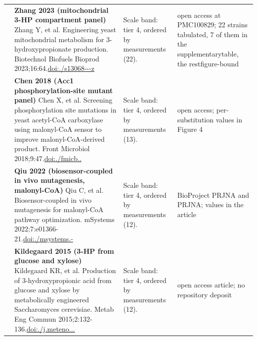 \begin{landscape}
\begin{longtable}{@{}r@{\hspace{4pt}} L{78mm} L{72mm} L{76mm}@{}}
 & \textbf{Zhang 2023 (mitochondrial 3-HP compartment panel)} \newline Zhang Y, et al. Engineering yeast mitochondrial metabolism for 3-hydroxypropionate production. Biotechnol Biofuels Bioprod 2023;16:64.\newline \href{https://doi.org/10.1186/s13068-023-02309-z}{doi:./\allowbreak s13068---\allowbreak z} & Scale band: tier 4, ordered by measurements (22). & open acc\allowbreak ess at P\allowbreak MC100829; 22 s\allowbreak trains t\allowbreak abulated\allowbreak , 7 of t\allowbreak hem in t\allowbreak he suppl\allowbreak ementary\allowbreak  table, \allowbreak the rest\allowbreak  figure-\allowbreak bound \\
 & \textbf{Chen 2018 (Acc1 phosphorylation-site mutant panel)} \newline Chen X, et al. Screening phosphorylation site mutations in yeast acetyl-CoA carboxylase using malonyl-CoA sensor to improve malonyl-CoA-derived product. Front Microbiol 2018;9:47.\newline \href{https://doi.org/10.3389/fmicb.2018.00047}{doi:./\allowbreak fmicb..} & Scale band: tier 4, ordered by measurements (13). & open acc\allowbreak ess; per\allowbreak -\allowbreak substit\allowbreak ution va\allowbreak lues in \allowbreak Figure 4 \\
 & \textbf{Qiu 2022 (biosensor-coupled in vivo mutagenesis, malonyl-CoA)} \newline Qiu C, et al. Biosensor-coupled in vivo mutagenesis for malonyl-CoA pathway optimization. mSystems 2022;7:e01366-21.\newline \href{https://doi.org/10.1128/msystems.01366-21}{doi:./\allowbreak msystem\allowbreak s.-} & Scale band: tier 4, ordered by measurements (12). & BioProje\allowbreak ct PRJNA a\allowbreak nd PRJNA; \allowbreak values i\allowbreak n the ar\allowbreak ticle \\
 & \textbf{Kildegaard 2015 (3-HP from glucose and xylose)} \newline Kildegaard KR, et al. Production of 3-hydroxypropionic acid from glucose and xylose by metabolically engineered Saccharomyces cerevisiae. Metab Eng Commun 2015;2:132-136.\newline \href{https://doi.org/10.1016/j.meteno.2015.10.001}{doi:./\allowbreak j.\allowbreak meteno...} & Scale band: tier 4, ordered by measurements (12). & open acc\allowbreak ess arti\allowbreak cle; no \allowbreak reposito\allowbreak ry depos\allowbreak it \\

\end{longtable}
\end{landscape}
